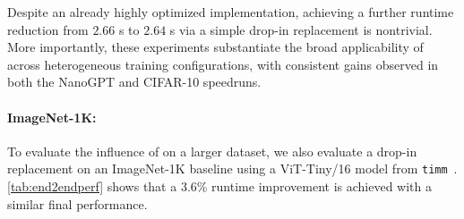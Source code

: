 Despite an already highly optimized implementation, achieving a further runtime reduction from $2.66$ s to $2.64$ s via a simple drop-in replacement is nontrivial. More importantly, these experiments substantiate the broad applicability of \turbomuon across heterogeneous training configurations, with consistent gains observed in both the NanoGPT and CIFAR-10 speedruns.
\fi

\paragraph{ImageNet-1K:} To evaluate the influence of \turbomuon on a larger dataset,
we also evaluate a drop-in replacement on an ImageNet-1K baseline using a ViT-Tiny/16 model from \texttt{timm}~\cite{rw2019timm}. 
\cref{tab:end2endperf} shows that a 3.6\% runtime improvement is achieved with a similar final performance. %


